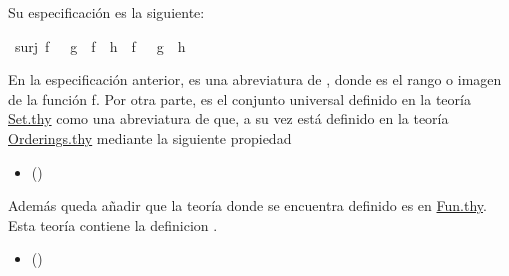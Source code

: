 \begin{isabellebody}
\begin{isamarkuptext}
Su especificación es la siguiente:%
\end{isamarkuptext}\isamarkuptrue%
\isamarkupfalse%
\ {\isachardoublequoteopen}surj\ f\ {\isasymLongrightarrow}\ {\isacharparenleft}\ g\ {\isasymo}\ f\ {\isacharequal}\ h\ {\isasymo}\ f\ {\isacharparenright}\ {\isacharequal}\ {\isacharparenleft}g\ {\isacharequal}\ h{\isacharparenright}{\isachardoublequoteclose}\isanewline
%
\isadelimproof
\ \ %
\endisadelimproof
%
\isatagproof
{}\isamarkupfalse%
%
\endisatagproof
{\isafoldproof}%
%
\isadelimproof
%
\endisadelimproof
%
\begin{isamarkuptext}%
En la especificación anterior,  es una abreviatura de 
  , donde  es el rango o imagen
de la función f.
 Por otra parte,  es el conjunto universal definido en la 
  teoría \href{http://bit.ly/2XtHCW6}{Set.thy} como una abreviatura de 
   que, a su vez está definido en la teoría 
  \href{http://bit.ly/2Xyj9Pe}{Orderings.thy} mediante la siguiente
  propiedad 
  \begin{itemize}
    \item[]  
      \hfill ()
  \end{itemize} 
Además queda añadir que la teoría donde se encuentra definido 
 es en \href{http://bit.ly/2XuPQx5}{Fun.thy}. Esta teoría contiene la
 definicion .
 \begin{itemize}
    \item[]  \hfill ()
  \end{itemize} 


\end{isamarkuptext}
\end{isabellebody}

